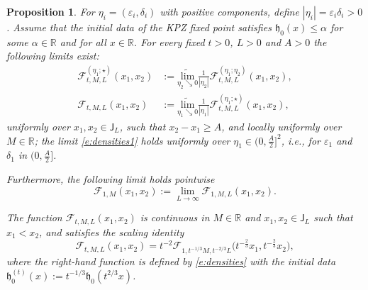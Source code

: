 \documentclass[oneside,final,11pt]{amsart}
\newtheorem{prop}[thm]{Proposition}
\theoremstyle{definition}
\newcommand{\fh}{\mathfrak{h}}
\newcommand{\mylim}[1]{\underset{#1}{\wt{\mathrm{lim}}}}
\newcommand{\bJ}{\mathsf{J}}
\newcommand{\R}{\mathbb{R}}
\newcommand{\dens}{\CF}
\newcommand{\1}[1]{\mathbf{1}_{#1}}
\newcommand{\eps}{\varepsilon}
\newcommand{\wt}{\widetilde}
\newcommand{\CF}{\mathcal{F}}
\numberwithin{equation}{section}
\begin{document}
\begin{prop}\label{prop:densities}
For $\eta_i = (\eps_i, \delta_i)$ with positive components, define $|\eta_i| = \eps_i \delta_i > 0$. Assume that the initial data of the KPZ fixed point satisfies $\fh_0(x) \leq \alpha$ for some $\alpha\in \mathbb{R}$ and for all $x \in \R$. For every fixed $t > 0$, $L > 0$ and $A > 0$ the  following  limits exist:
\begin{subequations}\label{eqs:densities}
\begin{align}
	\dens^{(\eta_1; \star)}_{t, M, L}(x_1, x_2) &:= \mylim{\eta_2 \searrow 0} \frac{1}{|\eta_2|} \dens^{(\eta_1; \eta_2)}_{t, M, L}(x_1, x_2),\label{e:densities1}\\
	\dens_{t, M, L}(x_1, x_2) &:= \mylim{\eta_1 \searrow 0} \frac{1}{|\eta_1|} \dens^{(\eta_1; \star)}_{t, M, L}(x_1, x_2),\label{e:densities}
\end{align}
\end{subequations}
uniformly over $x_1, x_2 \in \bJ_{L}$, such that $x_2 - x_1 \geq A$, and locally uniformly over $M \in \R$; the limit \eqref{e:densities1} holds uniformly over $\eta_1 \in (0, \frac{A}{2}]^2$, i.e., for $\eps_1$ and $\delta_1$ in $(0, \frac{A}{2}]$.

Furthermore, the following limit holds pointwise 
\begin{equation}\label{eq:P_limit}
\dens_{1, M}(x_1, x_2) := \lim_{L \to \infty} \dens_{1, M, L}(x_1, x_2).
\end{equation}

The function $\dens_{t, M, L}(x_1, x_2)$ is continuous in $M \in \R$ and $x_1, x_2 \in \bJ_{L}$ such that $x_1 < x_2$, and satisfies the scaling identity
\begin{equation}\label{e:densities_scale}
\dens_{t, M, L}(x_1, x_2) = t^{-2} \dens_{1, t^{-1/3} M, t^{-2/3} L} \bigl(t^{-\frac{2}{3}} x_1, t^{-\frac{2}{3}} x_2\bigr),
\end{equation}
where the right-hand function is defined by \eqref{e:densities} with the initial data $\fh_0^{(t)}(x) := t^{-1/3}\fh_0(t^{2/3} x)$.


\end{prop}
\end{document}
